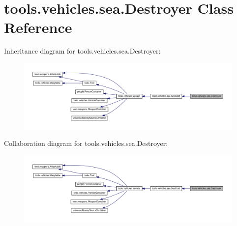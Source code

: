 \hypertarget{classtools_1_1vehicles_1_1sea_1_1_destroyer}{}\section{tools.\+vehicles.\+sea.\+Destroyer Class Reference}
\label{classtools_1_1vehicles_1_1sea_1_1_destroyer}


Inheritance diagram for tools.\+vehicles.\+sea.\+Destroyer\+:
\nopagebreak
\begin{figure}[H]
\begin{center}
\leavevmode
\includegraphics[width=350pt]{classtools_1_1vehicles_1_1sea_1_1_destroyer__inherit__graph}
\end{center}
\end{figure}


Collaboration diagram for tools.\+vehicles.\+sea.\+Destroyer\+:
\nopagebreak
\begin{figure}[H]
\begin{center}
\leavevmode
\includegraphics[width=350pt]{classtools_1_1vehicles_1_1sea_1_1_destroyer__coll__graph}
\end{center}
\end{figure}
